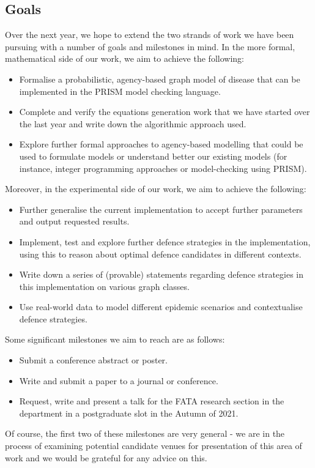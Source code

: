\documentclass[../report.tex]{subfiles}
\begin{document}
\subsection{Goals}

Over the next year, we hope to extend the two strands of work we have been pursuing with a number of goals and milestones in mind. In the more formal, mathematical side of our work, we aim to achieve the following:
\begin{itemize}
	\item Formalise a probabilistic, agency-based graph model of disease that can be implemented in the PRISM model checking language.
	\item Complete and verify the equations generation work that we have started over the last year and write down the algorithmic approach used.
	\item Explore further formal approaches to agency-based modelling that could be used to formulate models or understand better our existing models (for instance, integer programming approaches or model-checking using PRISM).
\end{itemize}
Moreover, in the experimental side of our work, we aim to achieve the following:
\begin{itemize}
	\item Further generalise the current implementation to accept further parameters and output requested results.
	\item Implement, test and explore further defence strategies in the implementation, using this to reason about optimal defence candidates in different contexts.
	\item Write down a series of (provable) statements regarding defence strategies in this implementation on various graph classes.
	\item Use real-world data to model different epidemic scenarios and contextualise defence strategies.
\end{itemize}

Some significant milestones we aim to reach are as follows:
\begin{itemize}
	\item Submit a conference abstract or poster.
	\item Write and submit a paper to a journal or conference.
	\item Request, write and present a talk for the FATA research section in the department in a postgraduate slot in the Autumn of 2021.
\end{itemize}
Of course, the first two of these milestones are very general - we are in the process of examining potential candidate venues for presentation of this area of work and we would be grateful for any advice on this.
\end{document}
